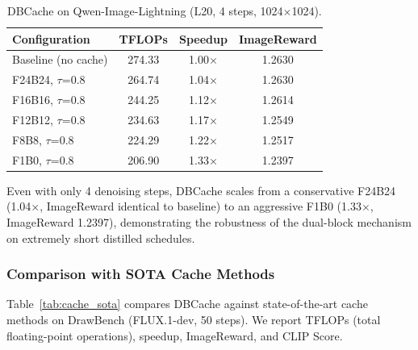 \documentclass[10pt]{article}
\begin{document}
\begin{table}[htbp]
\centering
\caption{DBCache on Qwen-Image-Lightning (L20, 4 steps, 1024$\times$1024).}
\label{tab:lightning}
{\small
\begin{tabular}{lccc}
\toprule
\textbf{Configuration} & \textbf{TFLOPs} & \textbf{Speedup} & \textbf{ImageReward} \\
\midrule
Baseline (no cache) & 274.33 & 1.00$\times$ & 1.2630 \\
F24B24, $\tau$=0.8 & 264.74 & 1.04$\times$ & 1.2630 \\
F16B16, $\tau$=0.8 & 244.25 & 1.12$\times$ & 1.2614 \\
F12B12, $\tau$=0.8 & 234.63 & 1.17$\times$ & 1.2549 \\
F8B8, $\tau$=0.8   & 224.29 & 1.22$\times$ & 1.2517 \\
F1B0, $\tau$=0.8   & 206.90 & 1.33$\times$ & 1.2397 \\
\bottomrule
\end{tabular}
}
\end{table}

Even with only 4 denoising steps, DBCache scales from a conservative F24B24 (1.04$\times$, ImageReward identical to baseline) to an aggressive F1B0 (1.33$\times$, ImageReward 1.2397), demonstrating the robustness of the dual-block mechanism on extremely short distilled schedules.

\subsubsection{Comparison with SOTA Cache Methods}

Table~\ref{tab:cache_sota} compares DBCache against state-of-the-art cache methods on DrawBench (FLUX.1-dev, 50 steps). We report TFLOPs (total floating-point operations), speedup, ImageReward, and CLIP Score.
\end{document}
